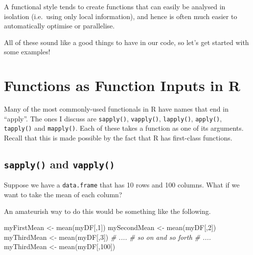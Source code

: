 \documentclass[
  12pt,
  krantz2]{krantz}
\makeatletter
\newenvironment{Shaded}{\begin{snugshade}}{\end{snugshade}}
\newcommand{\CommentTok}[1]{\textcolor[rgb]{0.37,0.37,0.37}{\textit{#1}}}
\newcommand{\DecValTok}[1]{\textcolor[rgb]{0.06,0.06,0.06}{#1}}
\newcommand{\FunctionTok}[1]{\textcolor[rgb]{0,0,0}{#1}}
\newcommand{\NormalTok}[1]{#1}
\newcommand{\OtherTok}[1]{\textcolor[rgb]{0.37,0.37,0.37}{#1}}
\renewenvironment{quote}{\begin{VF}}{\end{VF}}
\newenvironment{kframe}{%
\medskip{}
\setlength{\fboxsep}{.8em}
 \def\at@end@of@kframe{}%
 \ifinner\ifhmode%
  \def\at@end@of@kframe{\end{minipage}}%
  \begin{minipage}{\columnwidth}%
 \fi\fi%
 \def\FrameCommand##1{\hskip\@totalleftmargin \hskip-\fboxsep
 \colorbox{shadecolor}{##1}\hskip-\fboxsep
     \hskip-\linewidth \hskip-\@totalleftmargin \hskip\columnwidth}%
 \MakeFramed {\advance\hsize-\width
   \@totalleftmargin\z@ \linewidth\hsize
   \@setminipage}}%
 {\par\unskip\endMakeFramed%
 \at@end@of@kframe}
\renewenvironment{Shaded}{\begin{kframe}}{\end{kframe}}
\makeatother
\begin{document}
\begin{quote}
A functional style tends to create functions that can easily be analysed in isolation (i.e.~using only local information), and hence is often much easier to automatically optimise or parallelise.
\end{quote}

All of these sound like a good things to have in our code, so let's get started with some examples!

\hypertarget{functions-as-function-inputs-in-r}{%
\section{Functions as Function Inputs in R}\label{functions-as-function-inputs-in-r}}

Many of the most commonly-used functionals in R have names that end in ``apply''. The ones I discuss are \texttt{sapply()}, \texttt{vapply()}, \texttt{lapply()}, \texttt{apply()}, \texttt{tapply()} and \texttt{mapply()}. Each of these takes a function as one of its arguments. Recall that this is made possible by the fact that R has first-class functions.

\hypertarget{sapply-and-vapply}{%
\subsection{\texorpdfstring{\texttt{sapply()} and \texttt{vapply()}}{sapply() and vapply()}}\label{sapply-and-vapply}}

Suppose we have a \texttt{data.frame} that has 10 rows and 100 columns. What if we want to take the mean of each column?

An amateurish way to do this would be something like the following.

\begin{Shaded}
\begin{Highlighting}[]
\NormalTok{myFirstMean }\OtherTok{\textless{}{-}} \FunctionTok{mean}\NormalTok{(myDF[,}\DecValTok{1}\NormalTok{])}
\NormalTok{mySecondMean }\OtherTok{\textless{}{-}} \FunctionTok{mean}\NormalTok{(myDF[,}\DecValTok{2}\NormalTok{])}
\NormalTok{myThirdMean }\OtherTok{\textless{}{-}} \FunctionTok{mean}\NormalTok{(myDF[,}\DecValTok{3}\NormalTok{])}
\CommentTok{\# ....}
\CommentTok{\# so on and so forth}
\CommentTok{\# ....}
\NormalTok{myThirdMean }\OtherTok{\textless{}{-}} \FunctionTok{mean}\NormalTok{(myDF[,}\DecValTok{100}\NormalTok{])}
\end{Highlighting}
\end{Shaded}
\end{document}
